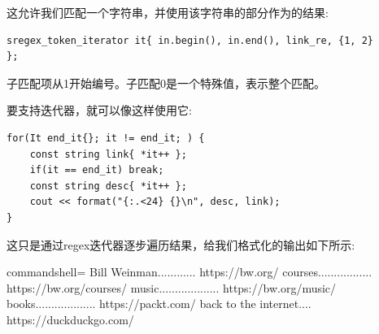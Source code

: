 这允许我们匹配一个字符串，并使用该字符串的部分作为的结果:

\begin{lstlisting}[style=styleCXX]
sregex_token_iterator it{ in.begin(), in.end(), link_re, {1, 2}
};
\end{lstlisting}

子匹配项从1开始编号。子匹配0是一个特殊值，表示整个匹配。

要支持迭代器，就可以像这样使用它:

\begin{lstlisting}[style=styleCXX]
for(It end_it{}; it != end_it; ) {
	const string link{ *it++ };
	if(it == end_it) break;
	const string desc{ *it++ };
	cout << format("{:.<24} {}\n", desc, link);
}
\end{lstlisting}

这只是通过regex迭代器逐步遍历结果，给我们格式化的输出如下所示:

\begin{tcblisting}{commandshell={}}
Bill Weinman............ https://bw.org/
courses................. https://bw.org/courses/
music................... https://bw.org/music/
books................... https://packt.com/
back to the internet.... https://duckduckgo.com/
\end{tcblisting}












